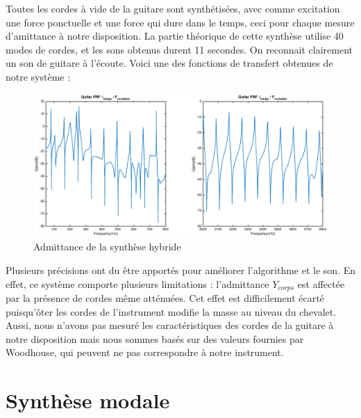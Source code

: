 Toutes les cordes à vide de la guitare sont synthétisées, avec comme excitation une force ponctuelle et une force qui dure dans le temps, ceci pour chaque mesure d'amittance à notre disposition. La partie théorique de cette synthèse utilise 40 modes de cordes, et les sons obtenus durent 11 secondes. On reconnait clairement un son de guitare à l'écoute. Voici une des fonctions de transfert obtenues de notre système :

\begin{figure}[h]
\centering
\includegraphics[width=\linewidth]{figures/FRF_E2.eps}
\caption{Admittance de la synthèse hybride}
\label{fig:frf_fig_1}
\end{figure}

Plusieurs précisions ont du être apportés pour améliorer l'algorithme et le
son. En effet, ce système comporte plusieurs limitations : l'admittance
$Y_{corps}$ est affectée par la présence de cordes même atténuées. Cet effet est difficilement écarté puisqu'ôter les cordes de l'instrument modifie la masse au niveau du chevalet. Aussi, nous n'avons pas mesuré les caractéristiques des cordes de la guitare à notre disposition mais nous sommes basés sur des valeurs fournies par Woodhouse, qui peuvent ne pas correspondre à notre instrument.\\


%
%
%
%


\section{Synthèse modale}

